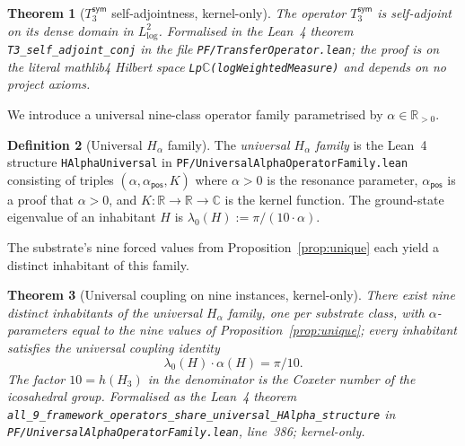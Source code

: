 \documentclass[11pt,a4paper]{amsart}
\theoremstyle{plain}
\newtheorem{theorem}{Theorem}[section]
\theoremstyle{definition}
\newtheorem{definition}[theorem]{Definition}
\begin{document}
\begin{theorem}[$T_3^{\textsf{sym}}$ self-adjointness, kernel-only]\label{thm:T3sym}
The operator $T_3^{\textsf{sym}}$ is self-adjoint on its dense domain in $L^2_{\log}$. Formalised in the Lean~4 theorem \texttt{T3\_self\_adjoint\_conj} in the file \texttt{PF/TransferOperator.lean}; the proof is on the literal mathlib4 Hilbert space \texttt{Lp\;}$\mathbb{C}$\texttt{\;(logWeightedMeasure)} and depends on no project axioms.
\end{theorem}

We introduce a universal nine-class operator family parametrised by $\alpha \in \mathbb{R}_{>0}$.

\begin{definition}[Universal $H_\alpha$ family]\label{def:Halpha}
The \emph{universal $H_\alpha$ family} is the Lean~4 structure \texttt{HAlphaUniversal} in \texttt{PF/UniversalAlphaOperatorFamily.lean} consisting of triples $(\alpha, \alpha_{\textsf{pos}}, K)$ where $\alpha > 0$ is the resonance parameter, $\alpha_{\textsf{pos}}$ is a proof that $\alpha > 0$, and $K : \mathbb{R} \to \mathbb{R} \to \mathbb{C}$ is the kernel function. The ground-state eigenvalue of an inhabitant $H$ is $\lambda_0(H) := \pi/(10\cdot\alpha)$.
\end{definition}

The substrate's nine forced values from Proposition~\ref{prop:unique} each yield a distinct inhabitant of this family.

\begin{theorem}[Universal coupling on nine instances, kernel-only]\label{thm:coupling}
There exist nine distinct inhabitants of the universal $H_\alpha$ family, one per substrate class, with $\alpha$-parameters equal to the nine values of Proposition~\ref{prop:unique}; every inhabitant satisfies the universal coupling identity
\[
\lambda_0(H) \cdot \alpha(H) = \pi/10.
\]
The factor $10 = h(H_3)$ in the denominator is the Coxeter number of the icosahedral group. Formalised as the Lean~4 theorem \texttt{all\_9\_framework\_operators\_share\_universal\_HAlpha\_structure} in \texttt{PF/UniversalAlphaOperatorFamily.lean}, line~386; kernel-only.
\end{theorem}
\end{document}
